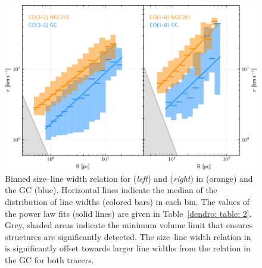 \begin{figure}
    \centering
    \includegraphics[width=\textwidth]{images/chapters/papers/dendro/dendro_fig2}
    \caption[Size--line width relation]{Binned size--line width relation for  (\emph{left}) and  (\emph{right}) in  (orange) and the GC (blue). Horizontal lines indicate the median of the distribution of line widths (colored bars) in each bin. The values of the power law fits (solid lines) are given in Table~\ref{dendro: table: 2}. Grey, shaded areas indicate the minimum volume limit that ensures structures are significantly detected.
    The size--line width relation in  is significantly offset towards larger line widths from the relation in the GC for both tracers.
    \label{dendro: figure: 2}}
\end{figure}


